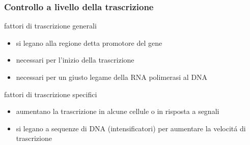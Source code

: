 \documentclass[hyperref={pdfpagelabels=false}]{beamer}
\begin{document}
\begin{frame} \frametitle{Controllo a livello della trascrizione}
\begin{block}{fattori di trascrizione generali}
\begin{itemize}
\item si legano alla regione detta promotore del gene
\item necessari per l'inizio della trascrizione
\item necessari per un giusto legame della RNA polimerasi al DNA
\end{itemize}
\end{block}
\begin{exampleblock}{fattori di trascrizione specifici}
\begin{itemize}
\item aumentano la trascrizione in alcune cellule o in risposta a segnali
\item si legano a sequenze di DNA (intensificatori) per aumentare la velocit\'a di trascrizione
\end{itemize}
\end{exampleblock}
\bigskip
\bigskip
\bigskip
\end{frame}
\end{document}
